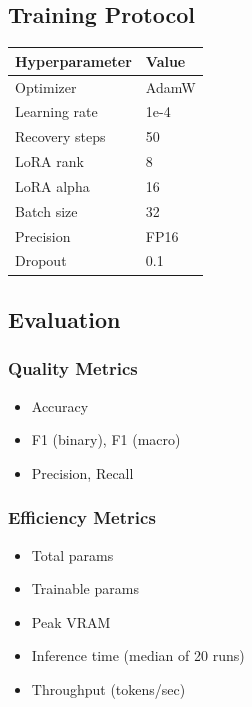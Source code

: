 \subsection{Training Protocol}

\begin{table}[H]
\centering
\small
\begin{tabular}{ll}
\toprule
\textbf{Hyperparameter} & \textbf{Value} \\
\midrule
Optimizer & AdamW \\
Learning rate & 1e-4 \\
Recovery steps & 50 \\
LoRA rank & 8 \\
LoRA alpha & 16 \\
Batch size & 32 \\
Precision & FP16 \\
Dropout & 0.1 \\
\bottomrule
\end{tabular}
\end{table}

\subsection{Evaluation}

\subsubsection{Quality Metrics}

\begin{itemize}
\item Accuracy
\item F1 (binary), F1 (macro)
\item Precision, Recall

\end{itemize}
\subsubsection{Efficiency Metrics}

\begin{itemize}
\item Total params
\item Trainable params
\item Peak VRAM
\item Inference time (median of 20 runs)
\item Throughput (tokens/sec)

\end{itemize}
